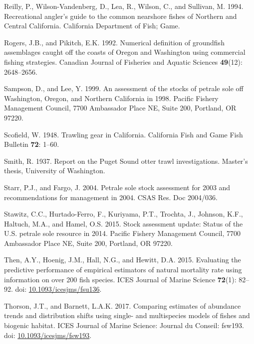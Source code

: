 \documentclass[12pt,]{article}
\begin{document}
\hypertarget{ref-reilly_recreational_1994}{}
Reilly, P., Wilson-Vandenberg, D., Lea, R., Wilson, C., and Sullivan, M.
1994. Recreational angler's guide to the common nearshore fishes of
Northern and Central California. California Department of Fish; Game.

\hypertarget{ref-rogers_numerical_1992}{}
Rogers, J.B., and Pikitch, E.K. 1992. Numerical definition of groundfish
assemblages caught off the coasts of Oregon and Washington using
commercial fishing strategies. Canadian Journal of Fisheries and Aquatic
Sciences \textbf{49}(12): 2648--2656.

\hypertarget{ref-sampson_assessment_1999}{}
Sampson, D., and Lee, Y. 1999. An assessment of the stocks of petrale
sole off Washington, Oregon, and Northern California in 1998. Pacific
Fishery Management Council, 7700 Ambassador Place NE, Suite 200,
Portland, OR 97220.

\hypertarget{ref-scofield_trawling_1948}{}
Scofield, W. 1948. Trawling gear in California. California Fish and Game
Fish Bulletin \textbf{72}: 1--60.

\hypertarget{ref-smith_report_1937}{}
Smith, R. 1937. Report on the Puget Sound otter trawl investigations.
Master's thesis, University of Washington.

\hypertarget{ref-starr_petrale_2004}{}
Starr, P.J., and Fargo, J. 2004. Petrale sole stock assessment for 2003
and recommendations for management in 2004. CSAS Res. Doc 2004/036.

\hypertarget{ref-stawitz_stock_2015}{}
Stawitz, C.C., Hurtado-Ferro, F., Kuriyama, P.T., Trochta, J., Johnson,
K.F., Haltuch, M.A., and Hamel, O.S. 2015. Stock assessment update:
Status of the U.S. petrale sole resource in 2014. Pacific Fishery
Management Council, 7700 Ambassador Place NE, Suite 200, Portland, OR
97220.

\hypertarget{ref-then_evaluating_2015}{}
Then, A.Y., Hoenig, J.M., Hall, N.G., and Hewitt, D.A. 2015. Evaluating
the predictive performance of empirical estimators of natural mortality
rate using information on over 200 fish species. ICES Journal of Marine
Science \textbf{72}(1): 82--92. doi:
\href{https://doi.org/10.1093/icesjms/fsu136}{10.1093/icesjms/fsu136}.

\hypertarget{ref-thorson_comparing_2017}{}
Thorson, J.T., and Barnett, L.A.K. 2017. Comparing estimates of
abundance trends and distribution shifts using single- and multispecies
models of fishes and biogenic habitat. ICES Journal of Marine Science:
Journal du Conseil: fsw193. doi:
\href{https://doi.org/10.1093/icesjms/fsw193}{10.1093/icesjms/fsw193}.
\end{document}
